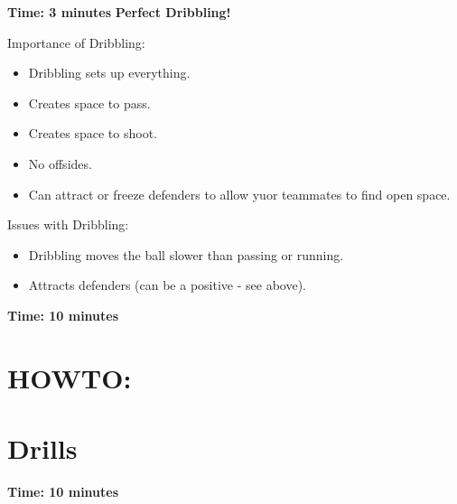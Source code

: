 \documentclass[10pt,letterpaper]{article}
\newenvironment{myalertblock}[1]{%
    \tcolorbox[beamer,%
    noparskip,breakable,
    colback=LightCoral,colframe=DarkRed,%
    colbacklower=Tomato!75!LightCoral,%
    title=#1]}%
    {\endtcolorbox}
\begin{document}
\textbf{Time: 3 minutes}
\begin{myalertblock}{Theme of the Practice}
    \textbf{Perfect Dribbling!}

    Importance of Dribbling:
    \begin{itemize}
        \setlength{\itemsep}{0pt}
        \setlength{\parskip}{0pt}
        \setlength{\parsep}{0pt}
        \item Dribbling sets up everything.
        \item Creates space to pass.
        \item Creates space to shoot.
        \item No offsides.
        \item Can attract or freeze defenders to allow yuor teammates to find open space.
    \end{itemize}

    Issues with Dribbling:
    \begin{itemize}
        \setlength{\itemsep}{0pt}
        \setlength{\parskip}{0pt}
        \setlength{\parsep}{0pt}
        \item Dribbling moves the ball slower than passing or running.
        \item Attracts defenders (can be a positive - see above).
    \end{itemize}

\end{myalertblock}

\textbf{Time: 10 minutes}


\section{HOWTO:}


\section{Drills}

\textbf{Time: 10 minutes}

\end{document}
